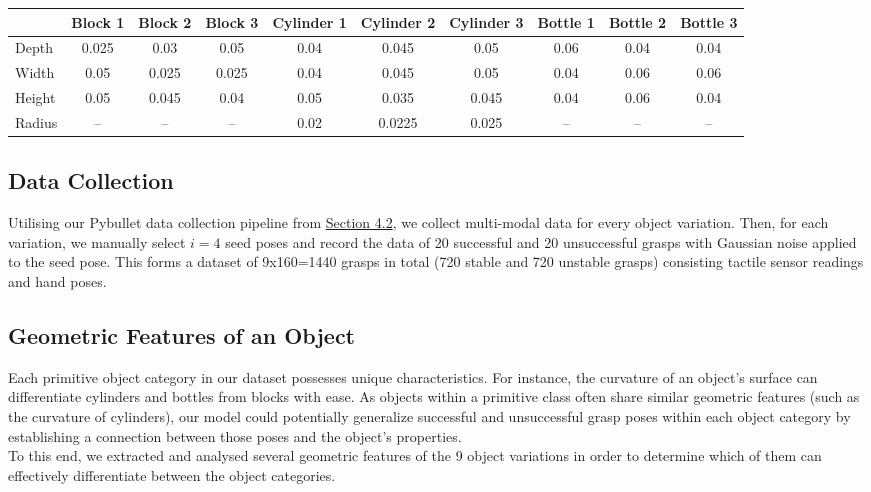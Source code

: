 \documentclass[11pt, a4paper]{report}
\theoremstyle{definition}
\begin{document}
\begin{table}[H]
{\begin{tabular}{lccccccccc}
            & Block 1 & Block 2 & Block 3 & Cylinder 1 & Cylinder 2 & Cylinder 3 & Bottle 1 & Bottle 2 & Bottle 3 \\
            \midrule
            Depth  & 0.025 & 0.03  & 0.05  & 0.04 & 0.045  & 0.05  & 0.06 & 0.04 & 0.04 \\
            Width  & 0.05  & 0.025 & 0.025 & 0.04 & 0.045  & 0.05  & 0.04 & 0.06 & 0.06 \\
            Height & 0.05  & 0.045 & 0.04  & 0.05 & 0.035  & 0.045 & 0.04 & 0.06 & 0.04 \\
            Radius & --    & --    & --    & 0.02 & 0.0225 & 0.025 & --   & --   & --   \\
            \bottomrule
        \end{tabular}
    }
    \label{tbl:5.1}
\end{table}


\subsection{Data Collection}
\label{sec:5.2.2}
Utilising our Pybullet data collection pipeline from \hyperref[sec:4.2]{Section 4.2}, we collect multi-modal data for every object variation. Then, for each variation, we manually select $i=4$ seed poses and record the data of 20 successful and 20 unsuccessful grasps with Gaussian noise applied to the seed pose. This forms a dataset of 9x160=1440 grasps in total (720 stable and 720 unstable grasps) consisting tactile sensor readings and hand poses.


\subsection{Geometric Features of an Object}
\label{sec:5.2.3}
Each primitive object category in our dataset possesses unique characteristics. For instance, the curvature of an object's surface can differentiate cylinders and bottles from blocks with ease. As objects within a primitive class often share similar geometric features (such as the curvature of cylinders), our model could potentially generalize successful and unsuccessful grasp poses within each object category by establishing a connection between those poses and the object's properties.\\

To this end, we extracted and analysed several geometric features of the 9 object variations in order to determine which of them can effectively differentiate between the object categories.
\end{document}
